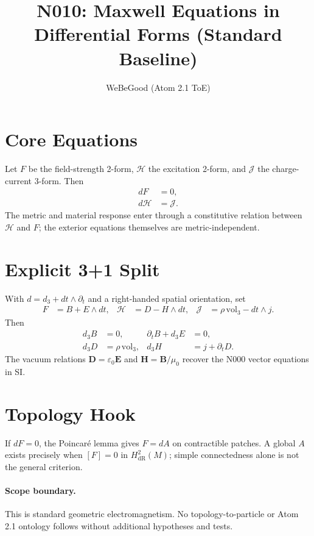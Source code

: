 \documentclass[11pt]{article}
\title{N010: Maxwell Equations in Differential Forms (Standard Baseline)}
\author{WeBeGood (Atom 2.1 ToE)}
\date{}
\begin{document}
\maketitle

\section{Core Equations}
Let $F$ be the field-strength 2-form, $\mathcal H$ the excitation 2-form,
and $\mathcal J$ the charge-current 3-form. Then
\begin{align}
 dF &= 0,\\
 d\mathcal H &= \mathcal J.
\end{align}
The metric and material response enter through a constitutive relation between
$\mathcal H$ and $F$; the exterior equations themselves are metric-independent.

\section{Explicit 3+1 Split}
With $d=d_3+dt\wedge\partial_t$ and a right-handed spatial orientation, set
\begin{align}
 F&=B+E\wedge dt, &
 \mathcal H&=D-H\wedge dt, &
 \mathcal J&=\rho\,\mathrm{vol}_3-dt\wedge j.
\end{align}
Then
\begin{align}
 d_3B&=0, & \partial_tB+d_3E&=0,\\
 d_3D&=\rho\,\mathrm{vol}_3, & d_3H&=j+\partial_tD.
\end{align}
The vacuum relations $\mathbf D=\varepsilon_0\mathbf E$ and
$\mathbf H=\mathbf B/\mu_0$ recover the N000 vector equations in SI.

\section{Topology Hook}
If $dF=0$, the Poincar\'e lemma gives $F=dA$ on contractible patches.
A global $A$ exists precisely when $[F]=0$ in $H^2_{\mathrm{dR}}(M)$;
simple connectedness alone is not the general criterion.

\paragraph{Scope boundary.}
This is standard geometric electromagnetism. No topology-to-particle or
Atom 2.1 ontology follows without additional hypotheses and tests.



\end{document}
